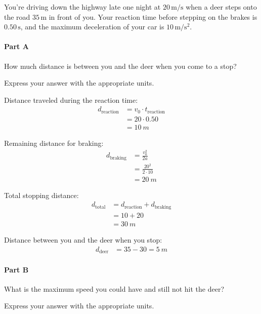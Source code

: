 You're driving down the highway late one night at \( 20 \, \mathrm{m/s} \) when a deer steps onto the road \( 35 \, \mathrm{m} \) in front of you. Your reaction time before stepping on the brakes is \( 0.50 \, \mathrm{s} \), and the maximum deceleration of your car is \( 10 \, \mathrm{m/s^2} \).

\paragraph{Part A}
How much distance is between you and the deer when you come to a stop?

Express your answer with the appropriate units.

\begin{solution}
	Distance traveled during the reaction time:
	\begin{align*}
		d_{\mathrm{reaction}} &= v_0 \cdot t_{\mathrm{reaction}} \\
		&= 20 \cdot 0.50 \\
		&= \SI{10}{m}
	\end{align*}

	Remaining distance for braking:
	\begin{align*}
		d_{\mathrm{braking}} &= \frac{v_0^2}{2a} \\
		&= \frac{20^2}{2 \cdot 10} \\
		&= \SI{20}{m}
	\end{align*}

	Total stopping distance:
	\begin{align*}
		d_{\mathrm{total}} &= d_{\mathrm{reaction}} + d_{\mathrm{braking}} \\
		&= 10 + 20 \\
		&= \SI{30}{m}
	\end{align*}

	Distance between you and the deer when you stop:
	\begin{align*}
		d_{\mathrm{deer}} &= 35 - 30 = \boxed{\SI{5}{m}}
	\end{align*}
\end{solution}

\paragraph{Part B}
What is the maximum speed you could have and still not hit the deer?

Express your answer with the appropriate units.

